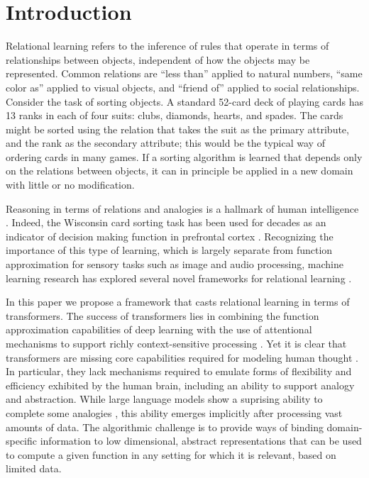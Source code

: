 \section{Introduction}
\label{sec:intro}

Relational learning refers to the inference of rules that operate in terms of
relationships between objects, independent of how the objects may be represented. Common relations are
``less than'' applied to natural numbers, ``same color as'' applied to visual objects, and ``friend of'' applied to
social relationships. Consider the task of sorting objects. A standard 52-card deck of playing cards has 13 ranks in
each of four suits: clubs, diamonds, hearts, and spades. The cards might be sorted using the relation that takes
the suit as the primary attribute, and the rank as the secondary attribute; this would be the typical 
way of ordering cards in many games. If a sorting algorithm is learned that depends 
only on the relations between objects, it can in principle be applied in a new domain with little 
or no modification. 

Reasoning in terms of relations and analogies is a hallmark of human intelligence 
\citep{snow,holyoak}.
Indeed, the Wisconsin card sorting task \citep{berg} has been used for decades as an indicator of decision making
function in prefrontal cortex \citep{monchi}. Recognizing the importance of this type of learning, which is largely
separate from function approximation for sensory tasks such as image and audio processing, machine learning research
has explored several novel frameworks for relational learning \citep{TEM, NTM,episodicControl,esbn,mondal23learned,
battaglia,barrett:2018,santoro1} .

In this paper we propose a framework that casts relational learning in terms of transformers. 
The success of transformers lies in combining the function approximation capabilities of deep learning with the use
of attentional mechanisms to support richly context-sensitive processing \citep{transformers,vaswani2017attention,
    kerg2020untangling}. Yet it is clear that transformers are missing core capabilities required for modeling human
thought \citep{mahowald2023dissociating}.  In particular, they lack mechanisms required to emulate forms of
flexibility and efficiency exhibited by the human brain, including an ability to support analogy and abstraction.
While large language models show a suprising ability to complete some analogies \citep{webb}, this ability 
emerges implicitly after processing vast amounts of data. The algorithmic challenge is to provide ways of binding domain-specific information to low dimensional, abstract representations that can be used to compute a given function in any setting for which it is relevant, based on limited data.

